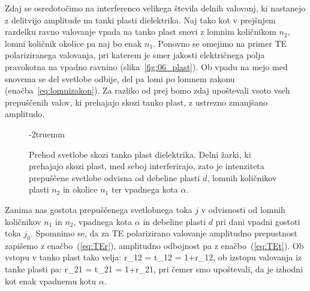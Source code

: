 Zdaj se osredotočimo na interferenco velikega števila delnih 
valovanj, ki nastanejo z delitvijo amplitude na tanki plasti dielektrika.
Naj tako kot v prejšnjem razdelku ravno valovanje vpada na tanko plast 
snovi z lomnim količnikom $n_2$, lomni količnik okolice pa naj bo enak $n_1$. 
Ponovno se omejimo na primer TE polariziranega valovanja, pri katerem
je smer jakosti električnega polja pravokotna na vpadno ravnino 
(slika~\ref{fig:06_plast}). Ob vpadu na mejo med snovema se del 
svetlobe odbije, del pa lomi po lomnem zakonu (enačba~\ref{eq:lomnizakon}).
Za razliko od prej bomo zdaj upoštevali vsoto vseh prepuščenih valov, 
ki prehajajo skozi tanko plast, z ustrezno zmanjšano amplitudo.
\begin{figure}[ht]
\centering
\def\svgwidth{70truemm} 

\caption{Prehod svetlobe skozi tanko plast dielektrika. Delni žarki, ki prehajajo
skozi plast, med seboj interferirajo, zato je intenziteta prepuščene svetlobe odvisna
od debeline plasti $d$, lomnih količnikov plasti $n_2$ in okolice $n_1$ ter vpadnega 
kota $\alpha$. }
\vglue-2truemm
\label{fig:06_plastmulti}
\end{figure}

Zanima nas gostota prepuščenega svetlobnega toka $j$ v odvisnosti od 
lomnih količnikov $n_1$ in $n_2$, vpadnega kota $\alpha$ in debeline plasti $d$ pri dani
vpadni gostoti toka $j_0$. Spomnimo se, da za TE polarizirano valovanje
amplitudno prepustnost zapišemo z enačbo~(\ref{eq:TEr}), amplitudno odbojnost
pa z enačbo~(\ref{eq:TEt}). Ob vstopu v tanko plast tako velja:
\beq
r_{12} = \qquad 
{}\qquad t_{12} = 1+r_{12},
\label{eq:06_35}
\eeq
ob izstopu valovanja iz tanke plasti pa:
\beq
r_{21} = \qquad 
{}\qquad t_{21} = 1+r_{21},
\label{eq:06_36}
\eeq
pri čemer smo upoštevali, da je izhodni kot enak vpadnemu kotu $\alpha$. 

